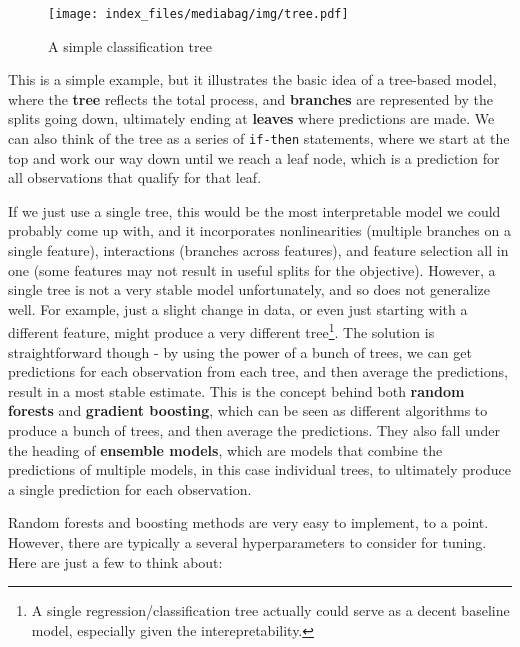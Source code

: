 \documentclass[
  letterpaper,
]{krantz}
\begin{document}
\hypertarget{tree-graph}{}

\begin{figure}

{\centering \texttt{[image: index\_files/mediabag/img/tree.pdf]}

}

\caption{A simple classification tree}

\end{figure}

This is a simple example, but it illustrates the basic idea of a
tree-based model, where the \textbf{tree} reflects the total process,
and \textbf{branches} are represented by the splits going down,
ultimately ending at \textbf{leaves} where predictions are made. We can
also think of the tree as a series of \texttt{if-then} statements, where
we start at the top and work our way down until we reach a leaf node,
which is a prediction for all observations that qualify for that leaf.

If we just use a single tree, this would be the most interpretable model
we could probably come up with, and it incorporates nonlinearities
(multiple branches on a single feature), interactions (branches across
features), and feature selection all in one (some features may not
result in useful splits for the objective). However, a single tree is
not a very stable model unfortunately, and so does not generalize well.
For example, just a slight change in data, or even just starting with a
different feature, might produce a very different tree\footnote{A single
  regression/classification tree actually could serve as a decent
  baseline model, especially given the interepretability.}. The solution
is straightforward though - by using the power of a bunch of trees, we
can get predictions for each observation from each tree, and then
average the predictions, result in a most stable estimate. This is the
concept behind both \textbf{random forests} and \textbf{gradient
boosting}, which can be seen as different algorithms to produce a bunch
of trees, and then average the predictions. They also fall under the
heading of \textbf{ensemble models}, which are models that combine the
predictions of multiple models, in this case individual trees, to
ultimately produce a single prediction for each observation.

Random forests and boosting methods are very easy to implement, to a
point. However, there are typically a several hyperparameters to
consider for tuning. Here are just a few to think about:
\end{document}
